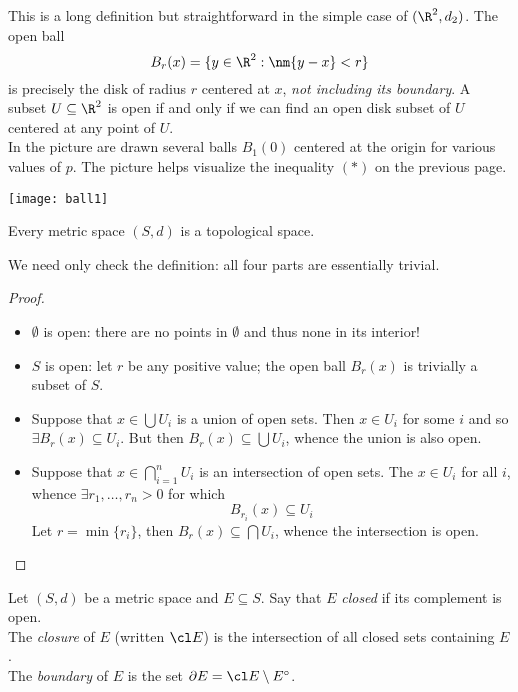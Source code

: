 \begin{minipage}[t]{0.45\linewidth}\vspace{0pt}
This is a long definition but straightforward in the simple case of $(\R^2,d_2)$. The open ball
\[B_r(x)=\{y\in\R^2:\nm{y-x}<r\}\]
is precisely the disk of radius $r$ centered at $x$, \emph{not including its boundary}. A subset $U\subseteq \R^2$ is open if and only if we can find an open disk subset of $U$ centered at any point of $U$.\\

In the picture are drawn several balls $B_1(0)$ centered at the origin for various values of $p$. The picture helps visualize the inequality $(\ast)$ on the previous page.
\end{minipage}
\begin{minipage}[t]{0.55\linewidth}\vspace{0pt}
\flushright\texttt{[image: ball1]}
\end{minipage}


\begin{thm}
Every metric space $(S,d)$ is a topological space.
\end{thm}

We need only check the definition: all four parts are essentially trivial.

\begin{proof}
\begin{itemize}
  \item $\emptyset$ is open: there are no points in $\emptyset$ and thus none in its interior!
  \item $S$ is open: let $r$ be any positive value; the open ball $B_r(x)$ is trivially a subset of $S$.
  \item Suppose that $x\in\bigcup U_i$ is a union of open sets. Then $x\in U_i$ for some $i$ and so $\exists B_r(x)\subseteq U_i$. But then $B_r(x)\subseteq\bigcup U_i$, whence the union is also open.
  \item Suppose that $x\in\bigcap\limits_{i=1}^nU_i$ is an intersection of open sets. The $x\in U_i$ for all $i$, whence $\exists r_1,\ldots,r_n>0$ for which
  \[B_{r_i}(x)\subseteq U_i\]
  Let $r=\min\{r_i\}$, then $B_r(x)\subseteq\bigcap U_i$, whence the intersection is open.\hfill\qedhere
\end{itemize}
\end{proof}

\begin{defn}
Let $(S,d)$ be a metric space and $E\subseteq S$. Say that $E$ \emph{closed} if its complement is open.\\
The \emph{closure} of $E$ (written $\cl E$) is the intersection of all closed sets containing $E$.\\
The \emph{boundary} of $E$ is the set $\partial E=\cl E\setminus E^\circ$.
\end{defn}

